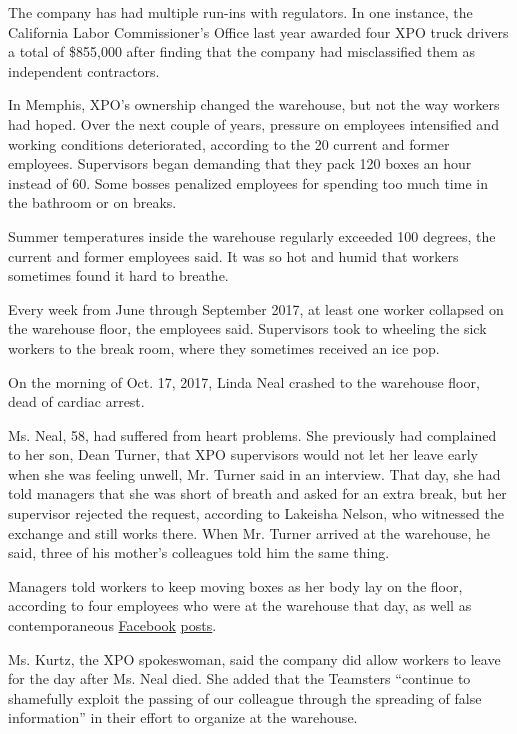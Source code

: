 The company has had multiple run-ins with regulators. In one instance,
the California Labor Commissioner's Office last year awarded four XPO
truck drivers a total of \$855,000 after finding that the company had
misclassified them as independent contractors.

In Memphis, XPO's ownership changed the warehouse, but not the way
workers had hoped. Over the next couple of years, pressure on employees
intensified and working conditions deteriorated, according to the 20
current and former employees. Supervisors began demanding that they pack
120 boxes an hour instead of 60. Some bosses penalized employees for
spending too much time in the bathroom or on breaks.

Summer temperatures inside the warehouse regularly exceeded 100 degrees,
the current and former employees said. It was so hot and humid that
workers sometimes found it hard to breathe.

Every week from June through September 2017, at least one worker
collapsed on the warehouse floor, the employees said. Supervisors took
to wheeling the sick workers to the break room, where they sometimes
received an ice pop.

On the morning of Oct. 17, 2017, Linda Neal crashed to the warehouse
floor, dead of cardiac arrest.

Ms. Neal, 58, had suffered from heart problems. She previously had
complained to her son, Dean Turner, that XPO supervisors would not let
her leave early when she was feeling unwell, Mr. Turner said in an
interview. That day, she had told managers that she was short of breath
and asked for an extra break, but her supervisor rejected the request,
according to Lakeisha Nelson, who witnessed the exchange and still works
there. When Mr. Turner arrived at the warehouse, he said, three of his
mother's colleagues told him the same thing.

Managers told workers to keep moving boxes as her body lay on the floor,
according to four employees who were at the warehouse that day, as well
as contemporaneous
\href{https://www.facebookcorewwwi.onion/kandie.hicks.14/posts/108370139925270}{Facebook}
\href{https://www.facebookcorewwwi.onion/kandie.hicks.14/posts/108360299926254?comment_id=108528973242720}{posts}.

Ms. Kurtz, the XPO spokeswoman, said the company did allow workers to
leave for the day after Ms. Neal died. She added that the Teamsters
``continue to shamefully exploit the passing of our colleague through
the spreading of false information'' in their effort to organize at the
warehouse.

